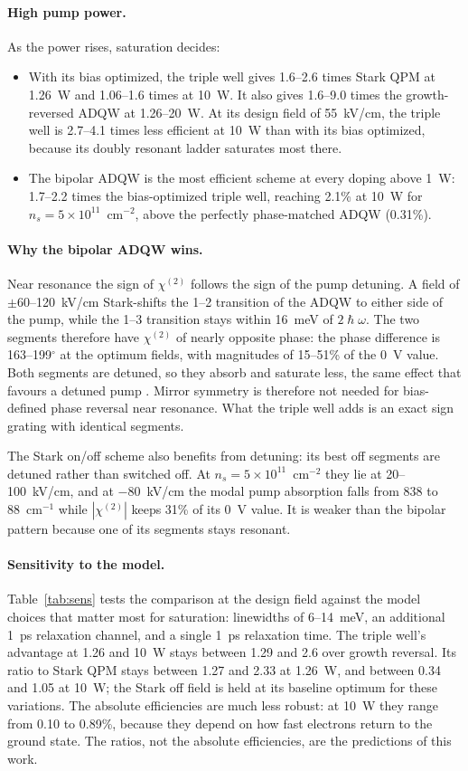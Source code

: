 \documentclass[11pt]{article}
\newcommand{\chitwo}{\chi^{(2)}}
\begin{document}
\paragraph{High pump power.} As the power rises, saturation decides:
\begin{itemize}
\item With its bias optimized, the triple well gives 1.6--2.6 times Stark QPM at 1.26~W and 1.06--1.6 times at 10~W. It also gives 1.6--9.0 times the growth-reversed ADQW at 1.26--20~W. At its design field of 55~kV/cm, the triple well is 2.7--4.1 times less efficient at 10~W than with its bias optimized, because its doubly resonant ladder saturates most there.
\item The bipolar ADQW is the most efficient scheme at every doping above 1~W: 1.7--2.2 times the bias-optimized triple well, reaching 2.1\% at 10~W for $n_s=5\times10^{11}$~cm$^{-2}$, above the perfectly phase-matched ADQW (0.31\%).
\end{itemize}

\paragraph{Why the bipolar ADQW wins.} Near resonance the sign of $\chitwo$ follows the sign of the pump detuning. A field of $\pm60$--120~kV/cm Stark-shifts the 1--2 transition of the ADQW to either side of the pump, while the 1--3 transition stays within 16~meV of $2\hslash\omega$. The two segments therefore have $\chitwo$ of nearly opposite phase: the phase difference is 163--199$^\circ$ at the optimum fields, with magnitudes of 15--51\% of the 0~V value. Both segments are detuned, so they absorb and saturate less, the same effect that favours a detuned pump \cite{OwnbyNL02}. Mirror symmetry is therefore not needed for bias-defined phase reversal near resonance. What the triple well adds is an exact sign grating with identical segments.

The Stark on/off scheme also benefits from detuning: its best off segments are detuned rather than switched off. At $n_s=5\times10^{11}$~cm$^{-2}$ they lie at 20--100~kV/cm, and at $-80$~kV/cm the modal pump absorption falls from 838 to 88~cm$^{-1}$ while $|\chitwo|$ keeps 31\% of its 0~V value. It is weaker than the bipolar pattern because one of its segments stays resonant.

\paragraph{Sensitivity to the model.} Table~\ref{tab:sens} tests the comparison at the design field against the model choices that matter most for saturation: linewidths of 6--14~meV, an additional 1~ps relaxation channel, and a single 1~ps relaxation time. The triple well's advantage at 1.26 and 10~W stays between 1.29 and 2.6 over growth reversal. Its ratio to Stark QPM stays between 1.27 and 2.33 at 1.26~W, and between 0.34 and 1.05 at 10~W; the Stark off field is held at its baseline optimum for these variations. The absolute efficiencies are much less robust: at 10~W they range from 0.10 to 0.89\%, because they depend on how fast electrons return to the ground state. The ratios, not the absolute efficiencies, are the predictions of this work.
\end{document}
